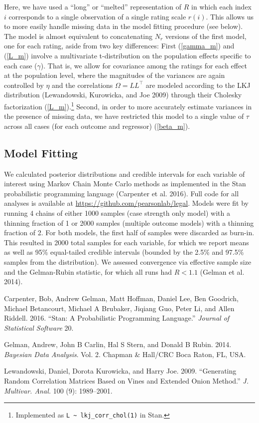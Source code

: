 \documentclass[
]{article}
\begin{document}
Here, we have used a ``long'' or ``melted'' representation of \(R\) in
which each index \(i\) corresponds to a single observation of a single
rating scale \(r(i)\). This allows us to more easily handle missing data
in the model fitting procedure (see below). The model is almost
equivalent to concatenating \(N_r\) versions of the first model, one for
each rating, aside from two key differences: First (\ref{gamma_m}) and
(\ref{L_m}) involve a multivariate t-distribution on the population
effects specific to each case (\(\gamma\)). That is, we allow for
covariance among the ratings for each effect at the population level,
where the magnitudes of the variances are again controlled by \(\eta\)
and the correlations \(\Omega = LL^\top\) are modeled according to the
LKJ distribution (Lewandowski, Kurowicka, and Joe 2009) through their
Cholesky factorization
(\ref{L_m}).\footnote{Implemented as \texttt{L \textasciitilde{} lkj\_corr\_chol(1)} in Stan.}
Second, in order to more accurately estimate variances in the presence
of missing data, we have restricted this model to a single value of
\(\tau\) across all cases (for each outcome and regressor)
(\ref{beta_m}).

\hypertarget{model-fitting}{%
\subsection{Model Fitting}\label{model-fitting}}

We calculated posterior distributions and credible intervals for each
variable of interest using Markov Chain Monte Carlo methods as
implemented in the Stan probabilistic programming language (Carpenter et
al. 2016). Full code for all analyses is available at
\url{https://github.com/pearsonlab/legal}. Models were fit by running 4
chains of either 1000 samples (case strength only model) with a thinning
fraction of 1 or 2000 samples (multiple outcome models) with a thinning
fraction of 2. For both models, the first half of samples were discarded
as burn-in. This resulted in 2000 total samples for each variable, for
which we report means as well as 95\% equal-tailed credible intervals
(bounded by the 2.5\% and 97.5\% samples from the distribution). We
assessed convergence via effective sample size and the Gelman-Rubin
statistic, for which all runs had \(\hat{R} < 1.1\) (Gelman et al.
2014).

\hypertarget{refs}{}
\leavevmode\hypertarget{ref-carpenter2016stan}{}%
Carpenter, Bob, Andrew Gelman, Matt Hoffman, Daniel Lee, Ben Goodrich,
Michael Betancourt, Michael A Brubaker, Jiqiang Guo, Peter Li, and Allen
Riddell. 2016. ``Stan: A Probabilistic Programming Language.''
\emph{Journal of Statistical Software} 20.

\leavevmode\hypertarget{ref-gelman2014bayesian}{}%
Gelman, Andrew, John B Carlin, Hal S Stern, and Donald B Rubin. 2014.
\emph{Bayesian Data Analysis}. Vol. 2. Chapman \& Hall/CRC Boca Raton,
FL, USA.

\leavevmode\hypertarget{ref-Lewandowski2009-tm}{}%
Lewandowski, Daniel, Dorota Kurowicka, and Harry Joe. 2009. ``Generating
Random Correlation Matrices Based on Vines and Extended Onion Method.''
\emph{J. Multivar. Anal.} 100 (9): 1989--2001.
\end{document}
